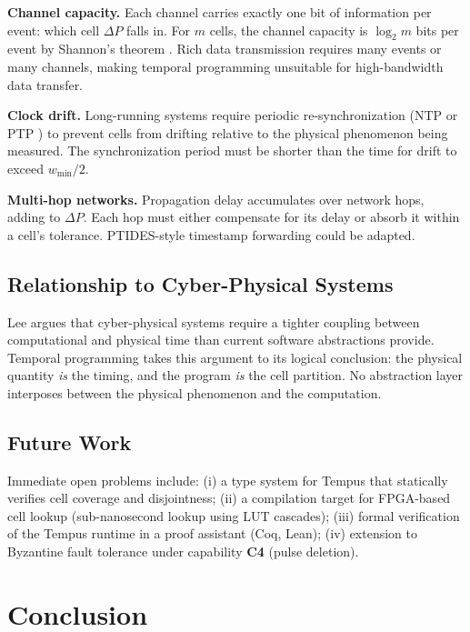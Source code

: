 \documentclass[twocolumn,10pt]{article}
\newcommand{\DP}{\Delta P}          %
\begin{document}
\textbf{Channel capacity.} Each channel carries exactly one bit of
information per event: which cell $\DP$ falls in. For $m$ cells,
the channel capacity is $\log_2 m$ bits per event by Shannon's
theorem \cite{shannon1948communication}. Rich data transmission
requires many events or many channels, making temporal programming
unsuitable for high-bandwidth data transfer.

\textbf{Clock drift.} Long-running systems require periodic
re-synchronization (NTP \cite{mills1991ntp} or PTP
\cite{ieee1588}) to prevent cells from drifting relative to the
physical phenomenon being measured. The synchronization period must
be shorter than the time for drift to exceed $w_{\min}/2$.

\textbf{Multi-hop networks.} Propagation delay accumulates over
network hops, adding to $\DP$. Each hop must either compensate for
its delay or absorb it within a cell's tolerance. PTIDES-style
timestamp forwarding \cite{zhao2007ptides} could be adapted.

\subsection{Relationship to Cyber-Physical Systems}

Lee \cite{lee2008cyber} argues that cyber-physical systems require
a tighter coupling between computational and physical time than
current software abstractions provide. Temporal programming takes
this argument to its logical conclusion: the physical quantity
\emph{is} the timing, and the program \emph{is} the cell partition.
No abstraction layer interposes between the physical phenomenon and
the computation.

\subsection{Future Work}

Immediate open problems include: (i) a type system for Tempus that
statically verifies cell coverage and disjointness; (ii) a compilation
target for FPGA-based cell lookup (sub-nanosecond lookup using LUT
cascades); (iii) formal verification of the Tempus runtime in a
proof assistant (Coq, Lean); (iv) extension to Byzantine fault
tolerance under capability \textbf{C4} (pulse deletion).

\section{Conclusion}
\label{sec:conclusion}
\end{document}
